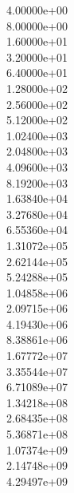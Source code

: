 4.00000e+00\\
8.00000e+00\\
1.60000e+01\\
3.20000e+01\\
6.40000e+01\\
1.28000e+02\\
2.56000e+02\\
5.12000e+02\\
1.02400e+03\\
2.04800e+03\\
4.09600e+03\\
8.19200e+03\\
1.63840e+04\\
3.27680e+04\\
6.55360e+04\\
1.31072e+05\\
2.62144e+05\\
5.24288e+05\\
1.04858e+06\\
2.09715e+06\\
4.19430e+06\\
8.38861e+06\\
1.67772e+07\\
3.35544e+07\\
6.71089e+07\\
1.34218e+08\\
2.68435e+08\\
5.36871e+08\\
1.07374e+09\\
2.14748e+09\\
4.29497e+09\\

